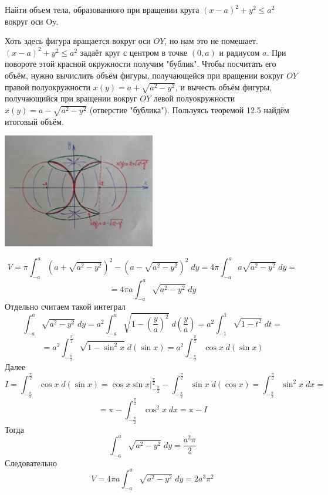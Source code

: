     \begin{example}
    	Найти объем тела, образованного при вращении круга $(x - a)^2 + y^2 \leqslant a^2$ вокруг оси Oy.
    \end{example}
    
    \begin{explanation}
    	Хоть здесь фигура вращается вокруг оси $OY$, но нам это не помешает. $(x - a)^2 + y^2 \leqslant a^2$ задаёт круг с центром в точке $(0, a)$ и радиусом $a$. При повороте этой красной окружности получим "бублик". Чтобы посчитать его объём, нужно вычислить объём фигуры, получающейся при вращении вокруг $OY$ правой полуокружности $x(y) = a + \sqrt{a^2 - y^2}$, и вычесть объём фигуры, получающийся при вращении вокруг $OY$ левой полуокружности $x(y) = a - \sqrt{a^2 - y^2}$ (отверстие "бублика"). Пользуясь теоремой 12.5 найдём итоговый объём.
    	\begin{center}
    		\includegraphics[width=0.5\textwidth]{img/lecture34/plot}
    	\end{center}
    	\[ V = \pi \int_{-a}^a (a + \sqrt{a^2 - y^2})^2 - (a - \sqrt{a^2 - y^2})^2 \; dy = 4\pi \int_{-a}^a a\sqrt{a^2 - y^2} \; dy = \]
    	\[ = 4\pi a \int_{-a}^a \sqrt{a^2 - y^2} \; dy \]
    	Отдельно считаем такой интеграл
    	\[ \int_{-a}^a \sqrt{a^2 - y^2} \; dy = a^2 \int_{-a}^a \sqrt{1 - (\frac{y}{a})^2} \; d(\frac{y}{a}) = a^2 \int_{-1}^1 \sqrt{1 - t^2} \; dt = \]
    	\[ = a^2 \int_{-\frac{\pi}{2}}^{\frac{\pi}{2}} \sqrt{1 - \sin^2{x}} \; d(\sin{x}) = a^2 \int_{-\frac{\pi}{2}}^{\frac{\pi}{2}} \cos{x} \; d(\sin{x}) \]
    	Далее
    	\[ I = \int_{-\frac{\pi}{2}}^{\frac{\pi}{2}} \cos{x} \; d(\sin{x}) = \cos{x} \sin{x} \bigg|_{-\frac{\pi}{2}}^{\frac{\pi}{2}} -  \int_{-\frac{\pi}{2}}^{\frac{\pi}{2}} \sin{x} \; d(\cos{x}) = \int_{-\frac{\pi}{2}}^{\frac{\pi}{2}} \sin^2{x} \; dx = \]
    	\[ = \pi - \int_{-\frac{\pi}{2}}^{\frac{\pi}{2}} \cos^2{x} \; dx = \pi - I \]
    	Тогда
    	\[ \int_{-a}^a \sqrt{a^2 - y^2} \; dy = \frac{a^2 \pi}{2} \]
    	Следовательно
    	\[ V = 4\pi a \int_{-a}^a \sqrt{a^2 - y^2} \; dy = 2a^3 \pi^2 \]
    \end{explanation}
    
